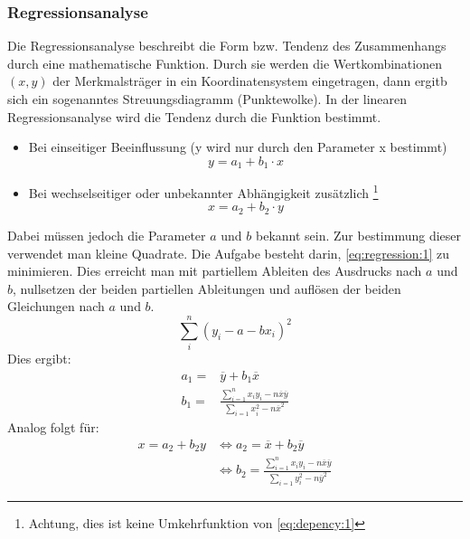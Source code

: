 \subsubsection{Regressionsanalyse}\label{theorie:regression}
Die Regressionsanalyse beschreibt die Form bzw. Tendenz des Zusammenhangs durch eine mathematische Funktion. Durch sie werden die Wertkombinationen $(x,y)$ der Merkmalsträger in ein Koordinatensystem eingetragen, dann ergitb sich ein sogenanntes Streuungsdiagramm (Punktewolke). In der linearen Regressionsanalyse wird die Tendenz durch die Funktion bestimmt.\\
\begin{itemize}
\item Bei einseitiger Beeinflussung (y wird nur durch den Parameter x bestimmt)
\begin{equation}
y=a_1+b_1\cdot x \label{eq:depency:1}
\end{equation}
\item Bei wechselseitiger oder unbekannter Abhängigkeit zusätzlich \footnote{Achtung, dies ist keine Umkehrfunktion von \autoref{eq:depency:1}}
\begin{equation}
x=a_2+b_2\cdot y
\end{equation}
\end{itemize}
Dabei müssen jedoch die Parameter $a$ und $b$ bekannt sein. Zur bestimmung dieser verwendet man kleine Quadrate. Die Aufgabe besteht darin, \autoref{eq:regression:1} zu minimieren. Dies erreicht man mit partiellem Ableiten des Ausdrucks nach $a$ und $b$, nullsetzen der beiden partiellen Ableitungen und auflösen der beiden Gleichungen nach $a$ und $b$. 
\begin{equation}\label{eq:regression:1}
\sum_i^n \left(y_i - a - bx_i\right)^2
\end{equation}
Dies ergibt:
\begin{align}
a_1 =& \overline{y} + b_1\overline{x} \label{eq:regression:4-1}\\
b_1 =& \frac{\sum_{i=1}^n x_i y_i - n\overline{x}\overline{y}}{\sum_{i=1}x_i^2-n\overline{x}^2} \label{eq:regression:4-2}
\end{align}
Analog folgt für:
\begin{align}
x=a_2+b_2y &\Longleftrightarrow a_2=\overline{x}+b_2\overline{y}\\
&\Longleftrightarrow b_2 = \frac{\sum_{i=1}^n x_i y_i - n\overline{x}\overline{y}}{\sum_{i=1}y_i^2-n\overline{y}^2}
\end{align}
